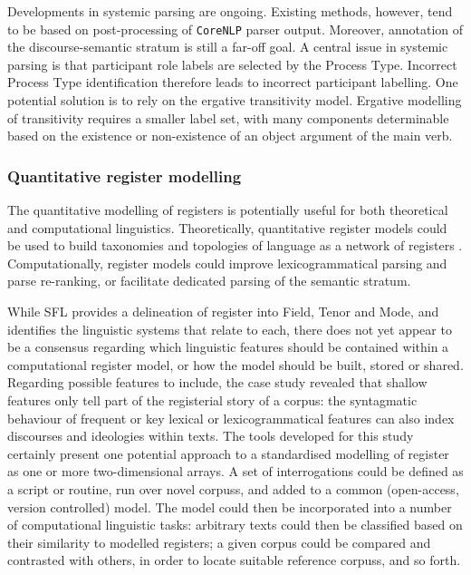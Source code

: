 \noindent Developments in systemic parsing are ongoing. Existing methods, however, tend to be based on post\hyp{}processing of \texttt{CoreNLP} parser output. Moreover, annotation of the \gls{discourse-semantic} stratum is still a far\hyp{}off goal. A central issue in systemic parsing is that participant role labels are selected by the Process Type. Incorrect Process Type identification therefore leads to incorrect participant labelling. One potential solution is to rely on the ergative transitivity model. Ergative modelling of transitivity requires a smaller label set, with many components determinable based on the existence or non\hyp{}existence of an object argument of the main verb.

\subsubsection{Quantitative register modelling}

The quantitative modelling of registers is potentially useful for both theoretical and computational linguistics. Theoretically, quantitative register models could be used to build taxonomies and topologies of language as a network of registers \cite{matthiessen_modeling_2015}. Computationally, register models could improve lexicogrammatical parsing and parse re\hyp{}ranking, or facilitate dedicated parsing of the semantic stratum. 

While \gls{SFL} provides a delineation of register into Field, Tenor and \gls{Mode}, and identifies the linguistic systems that relate to each, there does not yet appear to be a consensus regarding which linguistic features should be contained within a computational register model, or how the model should be built, stored or shared. Regarding possible features to include, the case study revealed that shallow features only tell part of the registerial story of a \gls{corpus}: the syntagmatic behaviour of frequent or key lexical or lexicogrammatical features can also index discourses and ideologies within texts. The tools developed for this study certainly present one potential approach to a standardised modelling of register as one or more two-dimensional arrays. A set of interrogations could be defined as a script or routine, run over novel \glspl{corpus}, and added to a common (open-access, version controlled) model. The model could then be incorporated into a number of computational linguistic tasks: arbitrary texts could then be classified based on their similarity to modelled registers; a given \gls{corpus} could be compared and contrasted with others, in order to locate suitable reference \glspl{corpus}, and so forth.

